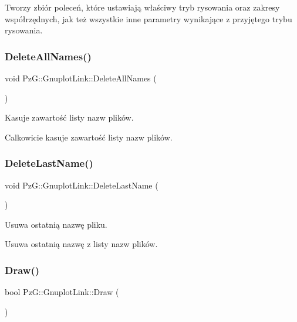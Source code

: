 Tworzy zbiór poleceń, które ustawiają właściwy tryb rysowania oraz zakresy współrzędnych, jak też wszystkie inne parametry wynikające z przyjętego trybu rysowania. \mbox{\label{class_pz_g_1_1_gnuplot_link_aa0e5912cf21d3e4ebaedfc4d473f1008}} 
\subsubsection{\texorpdfstring{Delete\+All\+Names()}{DeleteAllNames()}}
{\footnotesize\ttfamily void Pz\+G\+::\+Gnuplot\+Link\+::\+Delete\+All\+Names (\begin{DoxyParamCaption}{ }\end{DoxyParamCaption})}



Kasuje zawartość listy nazw plików. 

Calkowicie kasuje zawartość listy nazw plików. \mbox{\label{class_pz_g_1_1_gnuplot_link_acd96e1e3a99df66cfd68971f9974661f}} 
\subsubsection{\texorpdfstring{Delete\+Last\+Name()}{DeleteLastName()}}
{\footnotesize\ttfamily void Pz\+G\+::\+Gnuplot\+Link\+::\+Delete\+Last\+Name (\begin{DoxyParamCaption}{ }\end{DoxyParamCaption})}



Usuwa ostatnią nazwę pliku. 

Usuwa ostatnią nazwę z listy nazw plików. \mbox{\label{class_pz_g_1_1_gnuplot_link_a96321ba10f7ee9c5f55dd17a28143a39}} 
\subsubsection{\texorpdfstring{Draw()}{Draw()}}
{\footnotesize\ttfamily bool Pz\+G\+::\+Gnuplot\+Link\+::\+Draw (\begin{DoxyParamCaption}{ }\end{DoxyParamCaption})}

